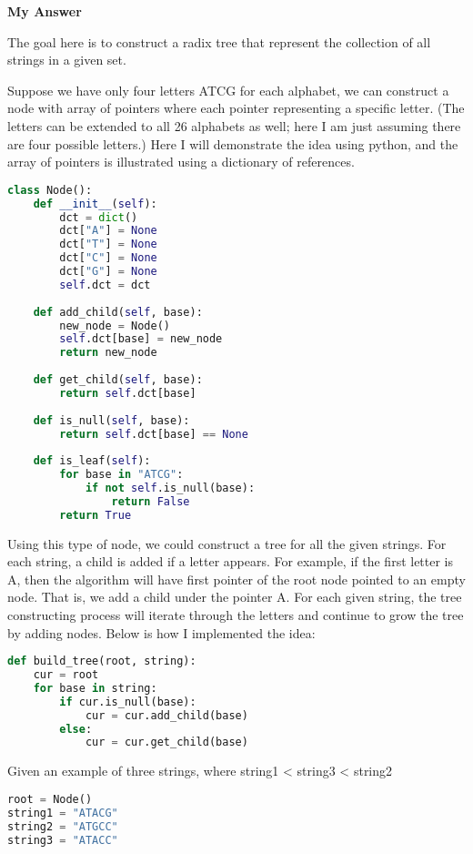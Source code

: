 \documentclass{article}
\begin{document}
\begin{enumerate}
\begin{enumerate}[label*=\arabic*.]
\textbf{My Answer}

The goal here is to construct a radix tree that represent the collection of all strings in a given set.

Suppose we have only four letters ATCG for each alphabet, we can construct a node with array of pointers where each pointer representing a specific letter. (The letters can be extended to all 26 alphabets as well; here I am just assuming there are four possible letters.) Here I will demonstrate the idea using python, and the array of pointers is illustrated using a dictionary of references.

\begin{lstlisting}[language=Python]
class Node():
    def __init__(self):
        dct = dict()
        dct["A"] = None
        dct["T"] = None
        dct["C"] = None
        dct["G"] = None
        self.dct = dct
        
    def add_child(self, base):
        new_node = Node()
        self.dct[base] = new_node
        return new_node
    
    def get_child(self, base):
        return self.dct[base]
    
    def is_null(self, base):
        return self.dct[base] == None 
    
    def is_leaf(self):
        for base in "ATCG":
            if not self.is_null(base):
                return False
        return True
\end{lstlisting}

Using this type of node, we could construct a tree for all the given strings. For each string, a child is added if a letter appears. For example, if the first letter is A, then the algorithm will have first pointer of the root node pointed to an empty node. That is, we add a child under the pointer A. For each given string, the tree constructing process will iterate through the letters and continue to grow the tree by adding nodes. Below is how I implemented the idea:

\begin{lstlisting}[language=Python]
def build_tree(root, string):
    cur = root
    for base in string:
        if cur.is_null(base):
            cur = cur.add_child(base)
        else:
            cur = cur.get_child(base)
\end{lstlisting}

Given an example of three strings, where string1 < string3 < string2

\begin{lstlisting}[language=Python]
root = Node()
string1 = "ATACG"
string2 = "ATGCC"
string3 = "ATACC"


\end{lstlisting}
\end{enumerate}
\end{enumerate}
\end{document}
